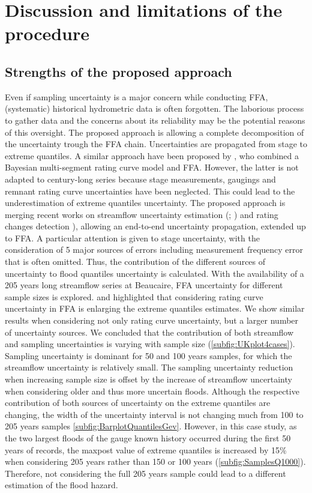 \documentclass[11pt]{article}
\begin{document}
\section{Discussion and limitations of the procedure}

    \subsection{Strengths of the proposed approach}

    Even if sampling uncertainty is a major concern while conducting FFA, (systematic) historical hydrometric data is often forgotten. The laborious process to gather data and the concerns about its reliability may be the potential reasons of this oversight. The proposed approach is allowing a complete decomposition of the uncertainty trough the FFA chain. Uncertainties are propagated from stage to extreme quantiles. A similar approach have been proposed by \citet{steinbakk_propagation_2016}, who combined a Bayesian multi-segment rating curve model and FFA. However, the latter is not adapted to century-long series because stage measurements, gaugings and remnant rating curve uncertainties have been neglected. This could lead to the underestimation of extreme quantiles uncertainty. The proposed approach is merging recent works on streamflow uncertainty estimation (\citet{horner_impact_2018}; \citet{mansanarez_shift_2019}) and rating changes detection \citep{darienzo_detection_2021}), allowing an end-to-end uncertainty propagation, extended up to FFA. A particular attention is given to stage uncertainty, with the consideration of 5 major sources of errors including measurement frequency error that is often omitted. Thus, the contribution of the different sources of uncertainty to flood quantiles uncertainty is calculated. With the availability of a 205 years long streamflow series at Beaucaire, FFA uncertainty for different sample sizes is explored. \citet{petersen-overleir_accounting_2009} and \citet{steinbakk_propagation_2016} highlighted that considering rating curve uncertainty in FFA is enlarging the extreme quantiles estimates. We show similar results when considering not only rating curve uncertainty, but a larger number of uncertainty sources. We concluded that the contribution of both streamflow and sampling uncertainties is varying with sample size (\ref{subfig:UKplot4cases}). Sampling uncertainty is dominant for 50 and 100 years samples, for which the streamflow uncertainty is relatively small. The sampling uncertainty reduction when increasing sample size is offset by the increase of streamflow uncertainty when considering older and thus more uncertain floods. Although the respective contribution of both sources of uncertainty on the extreme quantiles are changing, the width of the uncertainty interval is not changing much from 100 to 205 years samples \ref{subfig:BarplotQuantilesGev}. However, in this case study, as the two largest floods of the gauge known history occurred during the first 50 years of records, the maxpost value of extreme quantiles is increased by 15\% when considering 205 years rather than 150 or 100 years (\ref{subfig:SamplesQ1000}). Therefore, not considering the full 205 years sample could lead to a different estimation of the flood hazard. 
    
\end{document}
